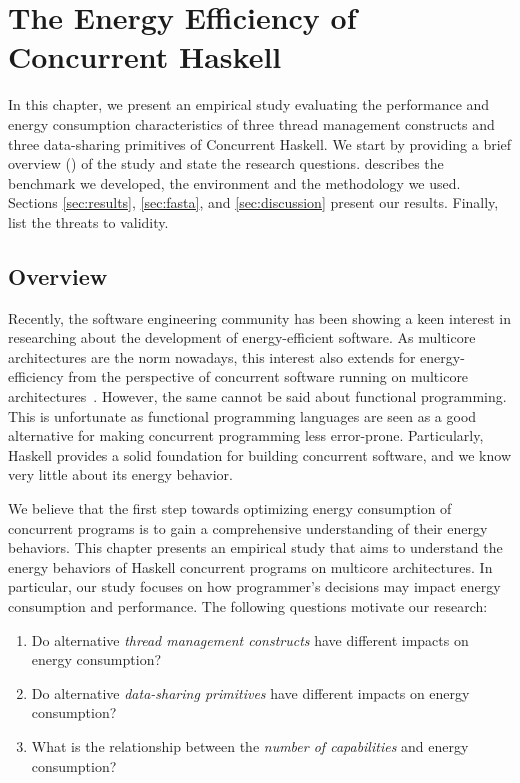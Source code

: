 \chapter{The Energy Efficiency of Concurrent Haskell}\label{chp:study}
In this chapter, we present an empirical study evaluating the performance and energy consumption characteristics of three thread management constructs and three data-sharing primitives of Concurrent Haskell. We start by providing a brief overview () of the study and state the research questions.  describes the benchmark we developed, the environment and the methodology we used. Sections \ref{sec:results}, \ref{sec:fasta}, and \ref{sec:discussion} present our results. Finally,  list the threats to validity.

\section{Overview}\label{sec:overview}
Recently, the software engineering community has been showing a keen interest in researching about the development of energy-efficient software. As multicore architectures are the norm nowadays, this interest also extends for energy-efficiency from the perspective of concurrent software running on multicore architectures~\cite{trefethen:2013,ribic:2014, pinto:2014}. However, the same cannot be said about functional programming. This is unfortunate as functional programming languages are seen as a good alternative for making concurrent programming less error-prone. %
Particularly, Haskell provides a solid foundation for building concurrent software, and we know very little about its energy behavior.

We believe that the first step towards optimizing energy consumption of concurrent programs is to gain a comprehensive understanding of their energy behaviors. This chapter presents an empirical study that aims to understand the energy behaviors of Haskell concurrent programs on multicore architectures. In particular, our study focuses on how programmer's decisions may impact energy consumption and performance. The following questions motivate our research:

\begin{enumerate}[label=\RQ{\arabic*}.]
  \item Do alternative \textit{thread management constructs} have different impacts on energy consumption?
  \item Do alternative \textit{data-sharing primitives} have different impacts on energy consumption?
  \item What is the relationship between the \textit{number of capabilities} and energy consumption?
\end{enumerate}

